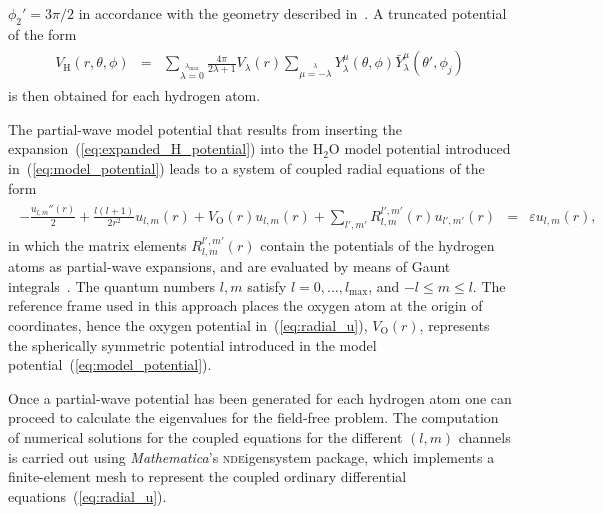 $\phi_{2}'=3\pi/2$ in accordance with the geometry described
in~\cite{Moccia_1964}. A truncated potential of the
form~\cite{marko_partialwave}
%
\begin{eqnarray}
  \begin{split}
    V_{\mathrm{H}}(r,\theta,\phi) & = & \sum\limits_{\lambda=0}
    \limits^{\lambda_{\mathrm{max}}} \frac{4\pi}{2\lambda + 1} V_{\lambda}(r)
    \sum\limits_{\mu=-\lambda}\limits^{\lambda} Y_{\lambda}^{\mu}(\theta,\phi)
    \bar{Y}_{\lambda}^{\mu}(\theta',\phi_{j})
  \end{split}
  \label{eq:expanded_H_potential}
\end{eqnarray}
%
is then obtained for each hydrogen atom.


The partial-wave model potential that results from inserting the
expansion~(\ref{eq:expanded_H_potential}) into the H$_{2}$O model
potential introduced in~(\ref{eq:model_potential}) leads to a system
of coupled radial equations of the form~\cite{marko_partialwave}
%
\begin{eqnarray}
  \begin{split}
    -\frac{u_{l,m}''(r)}{2} + \frac{l(l + 1)}{2r^{2}} u_{l,m}(r)
    + V_{\mathrm{O}}(r) u_{l,m}(r) + \sum\limits_{l',m'}
    R_{l,m}^{l',m'}(r) u_{l',m'}(r) & = & \varepsilon u_{l,m}(r),
  \end{split}
  \label{eq:radial_u}
\end{eqnarray}
%
in which the matrix elements $R_{l,m}^{l',m'}(r)$ contain the
potentials of the hydrogen atoms as partial-wave expansions, and are
evaluated by means of Gaunt integrals~\cite{marko_partialwave}. The
quantum numbers $l,m$ satisfy $l = 0, \dots, l_{\mathrm{max}}$, and
$-l \leq m \leq l$. The reference frame used in this approach places
the oxygen atom at the origin of coordinates, hence the oxygen
potential in~(\ref{eq:radial_u}), $V_{\mathrm{O}}(r)$, represents the
spherically symmetric potential introduced in the model
potential~(\ref{eq:model_potential}).

Once a partial-wave potential has been generated for each hydrogen
atom one can proceed to calculate the eigenvalues for the field-free
problem. The computation of numerical solutions for the coupled
equations for the different $(l,m)$ channels is carried out using
\emph{Mathematica}'s \textsc{nde}igensystem package, which implements
a finite-element mesh to represent the coupled ordinary differential
equations~(\ref{eq:radial_u}).

